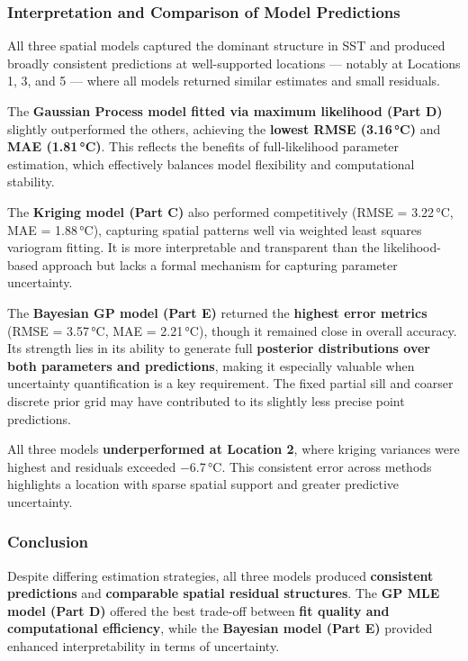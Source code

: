 \documentclass[
  11pt,
]{article}
\begin{document}
\subsubsection{\texorpdfstring{\textbf{Interpretation and Comparison of
Model
Predictions}}{Interpretation and Comparison of Model Predictions}}\label{interpretation-and-comparison-of-model-predictions}

All three spatial models captured the dominant structure in SST and
produced broadly consistent predictions at well-supported locations ---
notably at Locations 1, 3, and 5 --- where all models returned similar
estimates and small residuals.

The \textbf{Gaussian Process model fitted via maximum likelihood (Part
D)} slightly outperformed the others, achieving the \textbf{lowest RMSE
(3.16\,°C)} and \textbf{MAE (1.81\,°C)}. This reflects the benefits of
full-likelihood parameter estimation, which effectively balances model
flexibility and computational stability.

The \textbf{Kriging model (Part C)} also performed competitively (RMSE =
3.22\,°C, MAE = 1.88\,°C), capturing spatial patterns well via weighted
least squares variogram fitting. It is more interpretable and
transparent than the likelihood-based approach but lacks a formal
mechanism for capturing parameter uncertainty.

The \textbf{Bayesian GP model (Part E)} returned the \textbf{highest
error metrics} (RMSE = 3.57\,°C, MAE = 2.21\,°C), though it remained
close in overall accuracy. Its strength lies in its ability to generate
full \textbf{posterior distributions over both parameters and
predictions}, making it especially valuable when uncertainty
quantification is a key requirement. The fixed partial sill and coarser
discrete prior grid may have contributed to its slightly less precise
point predictions.

All three models \textbf{underperformed at Location 2}, where kriging
variances were highest and residuals exceeded −6.7\,°C. This consistent
error across methods highlights a location with sparse spatial support
and greater predictive uncertainty.

\subsubsection{\texorpdfstring{\textbf{Conclusion}}{Conclusion}}\label{conclusion-1}

Despite differing estimation strategies, all three models produced
\textbf{consistent predictions} and \textbf{comparable spatial residual
structures}. The \textbf{GP MLE model (Part D)} offered the best
trade-off between \textbf{fit quality and computational efficiency},
while the \textbf{Bayesian model (Part E)} provided enhanced
interpretability in terms of uncertainty.
\end{document}
